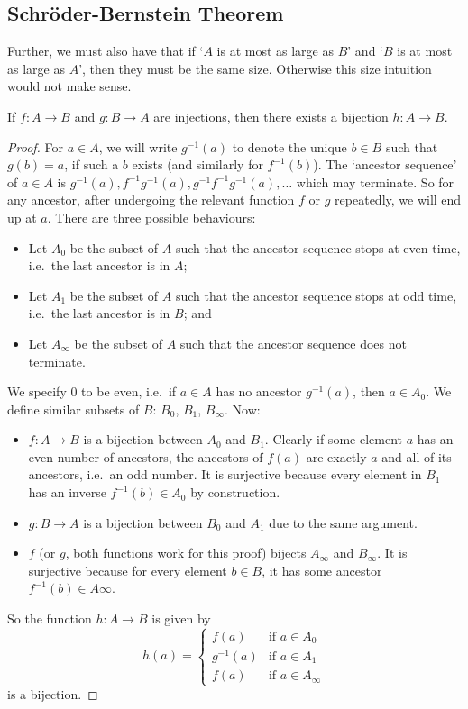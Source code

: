 \subsection{Schr\"oder-Bernstein Theorem}
Further, we must also have that if `\(A\) is at most as large as \(B\)' and `\(B\) is at most as large as \(A\)', then they must be the same size. Otherwise this size intuition would not make sense.
\begin{theorem}
	If \(f\colon A\to B\) and \(g\colon B\to A\) are injections, then there exists a bijection \(h\colon A\to B\).
\end{theorem}
\begin{proof}
	For \(a\in A\), we will write \(g^{-1}(a)\) to denote the unique \(b \in B\) such that \(g(b) = a\), if such a \(b\) exists (and similarly for \(f^{-1}(b)\)). The `ancestor sequence' of \(a \in A\) is \(g^{-1}(a), f^{-1}g^{-1}(a), g^{-1}f^{-1}g^{-1}(a), \dots\) which may terminate. So for any ancestor, after undergoing the relevant function \(f\) or \(g\) repeatedly, we will end up at \(a\). There are three possible behaviours:
	\begin{itemize}
		\item Let \(A_0\) be the subset of \(A\) such that the ancestor sequence stops at even time, i.e.\ the last ancestor is in \(A\);
		\item Let \(A_1\) be the subset of \(A\) such that the ancestor sequence stops at odd time, i.e.\ the last ancestor is in \(B\); and
		\item Let \(A_\infty\) be the subset of \(A\) such that the ancestor sequence does not terminate.
	\end{itemize}
	We specify 0 to be even, i.e.\ if \(a\in A\) has no ancestor \(g^{-1}(a)\), then \(a \in A_0\). We define similar subsets of \(B\): \(B_0\), \(B_1\), \(B_\infty\). Now:
	\begin{itemize}
		\item \(f\colon A \to B\) is a bijection between \(A_0\) and \(B_1\). Clearly if some element \(a\) has an even number of ancestors, the ancestors of \(f(a)\) are exactly \(a\) and all of its ancestors, i.e.\ an odd number. It is surjective because every element in \(B_1\) has an inverse \(f^{-1}(b) \in A_0\) by construction.
		\item \(g\colon B \to A\) is a bijection between \(B_0\) and \(A_1\) due to the same argument.
		\item \(f\) (or \(g\), both functions work for this proof) bijects \(A_\infty\) and \(B_\infty\). It is surjective because for every element \(b \in B\), it has some ancestor \(f^{-1}(b) \in A\infty\).
	\end{itemize}
	So the function \(h\colon A \to B\) is given by
	\[ h(a) = \begin{cases}
			f(a)      & \text{if } a \in A_0      \\
			g^{-1}(a) & \text{if } a \in A_1      \\
			f(a)      & \text{if } a \in A_\infty
		\end{cases} \]
	is a bijection.
\end{proof}
